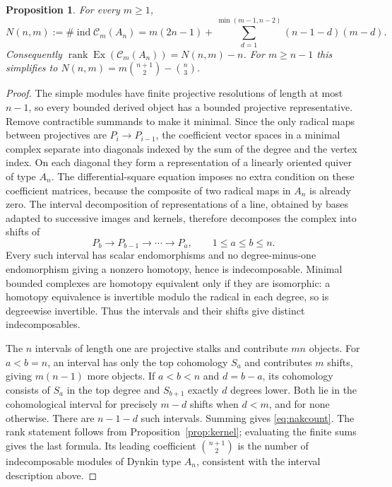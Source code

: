 \documentclass[pdflatex,sn-mathphys-num]{sn-jnl}
\numberwithin{equation}{section}
\newtheorem{proposition}[theorem]{Proposition}
\theoremstyle{definition}
\theoremstyle{remark}\newtheorem{remark}[theorem]{Remark}
\newcommand{\C}{\mathcal C}
\newcommand{\ind}{\operatorname{ind}}
\newcommand{\Ex}{\operatorname{Ex}}
\begin{document}
\begin{proposition}\label{prop:nakcount}
For every $m\geq1$,
\begin{equation}\label{eq:nakcount}
 N(n,m):=\#\ind\C_m(A_n)
 =m(2n-1)+\sum_{d=1}^{\min(m-1,n-2)}(n-1-d)(m-d).
\end{equation}
Consequently $\operatorname{rank}\Ex(\C_m(A_n))=N(n,m)-n$.
For $m\geq n-1$ this simplifies to
$N(n,m)=m\binom{n+1}{2}-\binom n3$.
\end{proposition}
\begin{proof}
The simple modules have finite projective resolutions of length at most
$n-1$, so every bounded derived object has a bounded projective
representative. Remove contractible summands to make it minimal.
Since the only radical maps between projectives are
$P_i\to P_{i-1}$, the coefficient vector spaces in a minimal complex
separate into diagonals indexed by the sum of the degree and the vertex
index. On each diagonal they form a representation of a linearly oriented
quiver of type $A_n$. The differential-square equation imposes no extra
condition on these coefficient matrices, because the composite of two
radical maps in $A_n$ is already zero. The interval decomposition of
representations of a line, obtained by bases adapted to successive images
and kernels, therefore decomposes the complex into shifts of
\[
 P_b\longrightarrow P_{b-1}\longrightarrow\cdots\longrightarrow P_a,
 \qquad 1\leq a\leq b\leq n.
\]
Every such interval has scalar endomorphisms and no degree-minus-one
endomorphism giving a nonzero homotopy, hence is indecomposable. Minimal
bounded complexes are homotopy equivalent only if they are isomorphic:
a homotopy equivalence is invertible modulo the radical in each degree,
so is degreewise invertible. Thus the intervals and their shifts give
distinct indecomposables.

The $n$ intervals of length one are projective stalks and contribute
$mn$ objects. For $a<b=n$, an interval has only the top cohomology
$S_a$ and contributes $m$ shifts, giving $m(n-1)$ more objects.
If $a<b<n$ and $d=b-a$, its cohomology consists of $S_a$ in the top
degree and $S_{b+1}$ exactly $d$ degrees lower. Both lie in the cohomological interval
for precisely $m-d$ shifts when $d<m$, and for none otherwise.
There are $n-1-d$ such intervals. Summing gives \eqref{eq:nakcount}.
The rank statement follows from Proposition~\ref{prop:kernel}; evaluating
the finite sums gives the last formula. Its leading coefficient
$\binom{n+1}{2}$ is the number of indecomposable modules of Dynkin
type $A_n$, consistent with the interval description above.
\end{proof}
\end{document}
